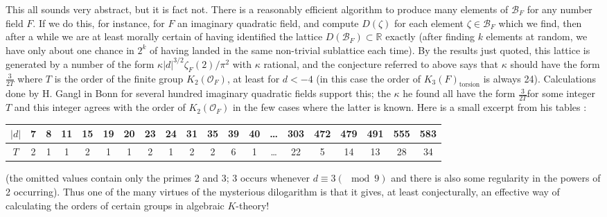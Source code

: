 This all sounds very abstract, but it is fact not. There is a reasonably efficient algorithm to produce many elements of $\mathscr{B}_{F}$ for any number field $F$. If we do this, for instance, for $F$ an imaginary quadratic field, and compute $D(\zeta)$ for each element $\zeta\in \mathscr{B}_{F}$ which we find, then after a while we are at least morally certain of having identified the lattice $D(\mathscr{B}_{F})\subset \mathbb{R}$ exactly (after finding $k$ elements at random, we have only about one chance in $2^{k}$ of having landed in the same non-trivial sublattice each time). By the results just quoted, this lattice is generated by a number of the form $\kappa |d|^{3/2}\zeta_{F}(2)/\pi^{2}$ with $\kappa$ rational, and the conjecture referred to above says that $\kappa$ should have the form $\frac{3}{2T}$ where $T$ is the order of the finite group $K_{2}(\mathscr{O}_{F})$, at least for $d<-4$ (in this case the order of $K_{3}(F)_{\text{torsion}}$ is always 24). Calculations done by H. Gangl in Bonn for several hundred imaginary quadratic fields support this; the $\kappa$ he found all have the form $\frac{3}{2T}$\pageoriginale for some integer $T$ and this integer agrees with the order of $K_{2}(\mathscr{O}_{F})$ in the few cases where the latter is known. Here is a small excerpt from his tables :
\begin{center}
\tabcolsep=1.7pt
\begin{tabular}{@{}c|ccccccccccccccccccc@{}}
$|d|$ & 7 & 8 & 11 & 15 & 19 & 20 & 23 & 24 & 31 & 35 & 39 & 40 & \ldots & 303 & 472 & 479 & 491 & 555 & 583\\
\hline
$T$ & 2 & 1 & 1 & 2 & 1 & 1 & 2 & 1 & 2 & 2 & 6 & 1 & \ldots & 22 & 5 & 14 & 13 & 28 & 34
\end{tabular}
\end{center}
(the omitted values contain only the primes 2 and 3; 3 occurs whenever $d\equiv 3(\mod 9)$ and there is also some regularity in the powers of 2 occurring). Thus one of the many virtues of the mysterious dilogarithm is that it gives, at least conjecturally, an effective way of calculating the orders of certain groups in algebraic $K$-theory!

